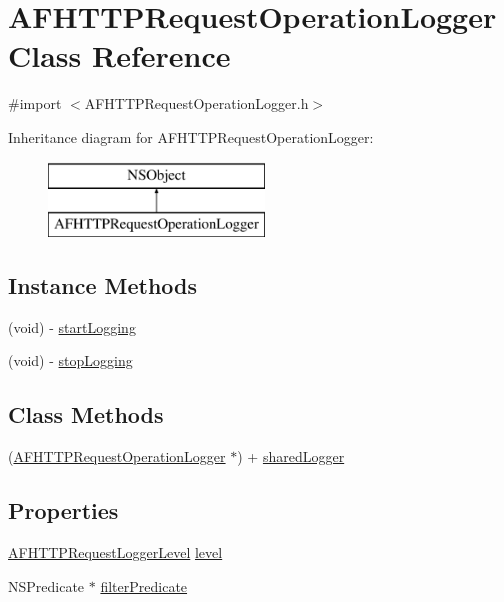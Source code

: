 \hypertarget{interface_a_f_h_t_t_p_request_operation_logger}{\section{A\-F\-H\-T\-T\-P\-Request\-Operation\-Logger Class Reference}
\label{interface_a_f_h_t_t_p_request_operation_logger}
}


{\ttfamily \#import $<$A\-F\-H\-T\-T\-P\-Request\-Operation\-Logger.\-h$>$}

Inheritance diagram for A\-F\-H\-T\-T\-P\-Request\-Operation\-Logger\-:\begin{figure}[H]
\begin{center}
\leavevmode
\includegraphics[height=2.000000cm]{interface_a_f_h_t_t_p_request_operation_logger}
\end{center}
\end{figure}
\subsection*{Instance Methods}
\begin{DoxyCompactItemize}
\item 
(void) -\/ \hyperlink{interface_a_f_h_t_t_p_request_operation_logger_a4b646649b770e3014400f1367d8e06b8}{start\-Logging}
\item 
(void) -\/ \hyperlink{interface_a_f_h_t_t_p_request_operation_logger_a9d68983031678ec8091b8b6ec1f43806}{stop\-Logging}
\end{DoxyCompactItemize}
\subsection*{Class Methods}
\begin{DoxyCompactItemize}
\item 
(\hyperlink{interface_a_f_h_t_t_p_request_operation_logger}{A\-F\-H\-T\-T\-P\-Request\-Operation\-Logger} $\ast$) + \hyperlink{interface_a_f_h_t_t_p_request_operation_logger_a4dd996224aa2c1a0cddffd5449840794}{shared\-Logger}
\end{DoxyCompactItemize}
\subsection*{Properties}
\begin{DoxyCompactItemize}
\item 
\hyperlink{_a_f_h_t_t_p_request_operation_logger_8h_af9dc5db42d8a3a9292bfe8c43f421c74}{A\-F\-H\-T\-T\-P\-Request\-Logger\-Level} \hyperlink{interface_a_f_h_t_t_p_request_operation_logger_aadcb4568ad6dfad078e76cbe06c4b7d6}{level}
\item 
N\-S\-Predicate $\ast$ \hyperlink{interface_a_f_h_t_t_p_request_operation_logger_a3a02da0b24362a3411f4333ea9323618}{filter\-Predicate}
\end{DoxyCompactItemize}


